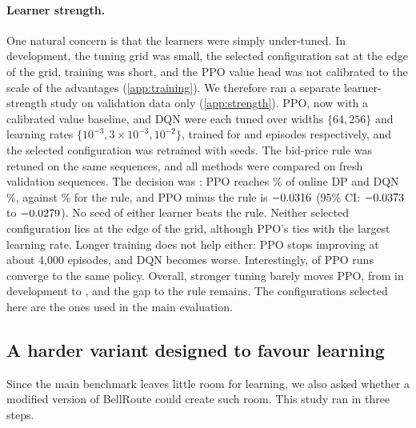\documentclass[10pt]{article}
\newcommand{\bellroute}{BellRoute}
\begin{document}
\paragraph{Learner strength.} One natural concern is that the learners were simply under-tuned. In development, the tuning grid was small, the selected configuration sat at the edge of the grid, training was short, and the PPO value head was not calibrated to the scale of the advantages (\cref{app:training}). We therefore ran a separate learner-strength study on validation data only (\cref{app:strength}). PPO, now with a calibrated value baseline, and DQN were each tuned over widths $\{64,256\}$ and learning rates $\{10^{-3},3{\times}10^{-3},10^{-2}\}$, trained for \lsPPOEpisodes{} and \lsDQNEpisodes{} episodes respectively, and the selected configuration was retrained with \lsSeeds{} seeds. The bid-price rule was retuned on the same sequences, and all methods were compared on fresh validation sequences. The decision was \texttt{\lsDecision}: PPO reaches \lsPPOFrac\% of online DP and DQN \lsDQNFrac\%, against \lsRuleFrac\% for the rule, and PPO minus the rule is $-0.0316$ (95\% CI: $-0.0373$ to $-0.0279$). No seed of either learner beats the rule. Neither selected configuration lies at the edge of the grid, although PPO's ties with the largest learning rate. Longer training does not help either: PPO stops improving at about 4{,}000 episodes, and DQN becomes worse. Interestingly, \lsPPOSameTop{} of \lsPPOTrials{} PPO runs converge to the same policy. Overall, stronger tuning barely moves PPO, from \develPPO{} in development to \lsPPOCmp, and the gap to the rule remains. The configurations selected here are the ones used in the main evaluation.

\subsection{A harder variant designed to favour learning}\label{sec:harder}

Since the main benchmark leaves little room for learning, we also asked whether a modified version of \bellroute{} could create such room. This study ran in three steps.
\end{document}
